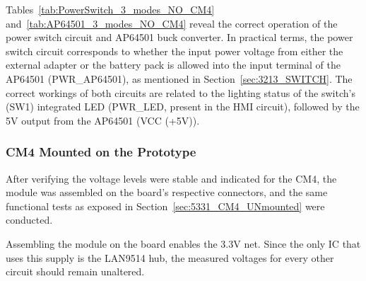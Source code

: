Tables~\ref{tab:PowerSwitch_3_modes_NO_CM4} and~\ref{tab:AP64501_3_modes_NO_CM4} reveal the correct operation of the power switch circuit and AP64501 buck converter. In practical terms, the power switch circuit corresponds to whether the input power voltage from either the external adapter or the battery pack is allowed into the input terminal of the AP64501 (PWR\_AP64501), as mentioned in Section~\ref{sec:3213_SWITCH}. The correct workings of both circuits are related to the lighting status of the switch's (SW1) integrated LED (PWR\_LED, present in the HMI circuit), followed by the 5V output from the AP64501 (VCC (+5V)).





\subsubsection{CM4 Mounted on the Prototype}\label{5332_CM4_Mounted_ON}

After verifying the voltage levels were stable and indicated for the CM4, the module was assembled on the board's respective connectors, and the same functional tests as exposed in Section~\ref{sec:5331_CM4_UNmounted} were conducted.

Assembling the module on the board enables the 3.3V net. Since the only IC that uses this supply is the LAN9514 hub, the measured voltages for every other circuit should remain unaltered.

